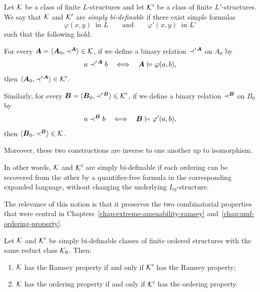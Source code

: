 \begin{definition}
    \label{def:simple-bi-definability}
    Let \(\mathcal{K}\) be a class of finite \(L\)-structures and let \(\mathcal{K}'\) be a class of finite \(L'\)-structures. We say that \(\mathcal{K}\) and \(\mathcal{K}'\) are \emph{simply bi-definable} if there exist simple formulas
    \[
        \varphi(x,y)\ \text{ in } L
        \qquad\text{and}\qquad
        \varphi'(x,y)\ \text{ in } L'
    \]
    such that the following hold.

    For every \(\boldsymbol{A}=\langle \boldsymbol{A}_0,\prec^{\boldsymbol{A}}\rangle\in \mathcal{K}\),
    if we define a binary relation \(\prec'^{\,\boldsymbol{A}}\) on \(A_0\) by
    \[
        a\prec'^{\,\boldsymbol{A}} b
        \quad\Longleftrightarrow\quad
        \boldsymbol{A}\models \varphi(a,b),
    \]
    then \(\langle \boldsymbol{A}_0,\prec'^{\,\boldsymbol{A}}\rangle\in \mathcal{K}'\).

    Similarly, for every
    \(\boldsymbol{B}=\langle \boldsymbol{B}_0,\prec'^{\,\boldsymbol{B}}\rangle\in \mathcal{K}'\),
    if we define a binary relation \(\prec^{\boldsymbol{B}}\) on \(B_0\) by
    \[
        a\prec^{\boldsymbol{B}} b
        \quad\Longleftrightarrow\quad
        \boldsymbol{B}\models \varphi'(a,b),
    \]
    then \(\langle \boldsymbol{B}_0,\prec^{\boldsymbol{B}}\rangle\in \mathcal{K}\).

    Moreover, these two constructions are inverse to one another up to isomorphism.
\end{definition}

In other words, \(\mathcal{K}\) and \(\mathcal{K}'\) are simply bi-definable if each ordering can be recovered from the other by a quantifier-free formula in the corresponding expanded language, without changing the underlying \(L_0\)-structure.

The relevance of this notion is that it preserves the two combinatorial properties that were central in Chapters~\ref{chap:extreme-amenability-ramsey} and~\ref{chap:umf-ordering-property}.

\begin{proposition}
    \label{prop:simple-bi-definability-preserves-properties}
    Let \(\mathcal{K}\) and \(\mathcal{K}'\) be simply bi-definable classes of finite ordered structures with the same reduct class \(\mathcal{K}_0\). Then:
    \begin{enumerate}
        \item[(i)] \(\mathcal{K}\) has the Ramsey property if and only if \(\mathcal{K}'\) has the Ramsey property;
        \item[(ii)] \(\mathcal{K}\) has the ordering property if and only if \(\mathcal{K}'\) has the ordering property.
    \end{enumerate}
\end{proposition}

